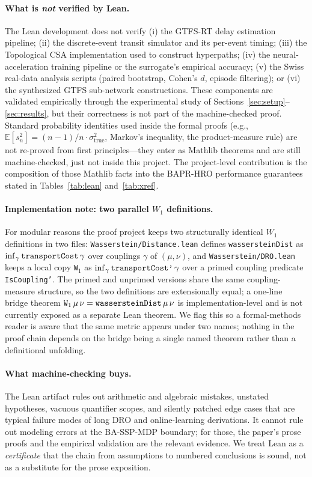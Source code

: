 \documentclass[opre,dblanonrev]{informs4}
\renewcommand{\mathtt}[1]{\mbox{\ttfamily #1}}
\begin{document}
\paragraph{What is \emph{not} verified by Lean.}
The Lean development does not verify (i) the GTFS-RT delay
estimation pipeline; (ii) the discrete-event transit simulator and
its per-event timing; (iii) the Topological CSA implementation used
to construct hyperpaths; (iv) the neural-acceleration training
pipeline or the surrogate's empirical accuracy; (v) the Swiss
real-data analysis scripts (paired bootstrap, Cohen's $d$, episode
filtering); or (vi) the synthesized GTFS sub-network constructions.
These components are validated empirically through the experimental
study of Sections~\ref{sec:setup}--\ref{sec:results}, but their
correctness is not part of the machine-checked proof. Standard
probability identities used inside the formal proofs (e.g.,
$\mathbb{E}[s_n^2] = (n-1)/n \cdot \sigma_{\mathrm{true}}^2$,
Markov's inequality, the product-measure rule) are not re-proved
from first principles---they enter as Mathlib theorems and are still
machine-checked, just not inside this project. The project-level
contribution is the composition of those Mathlib facts into the
BAPR-HRO performance guarantees stated in Tables~\ref{tab:lean}
and~\ref{tab:xref}.

\paragraph{Implementation note: two parallel $W_1$ definitions.}
For modular reasons the proof project keeps two structurally
identical $W_1$ definitions in two files: \texttt{Wasserstein/Distance.lean}
defines \texttt{wassersteinDist} as $\inf_\gamma \mathtt{transportCost}\,\gamma$
over couplings $\gamma$ of $(\mu,\nu)$, and
\texttt{Wasserstein/DRO.lean} keeps a local copy \texttt{W$_1$} as
$\inf_\gamma \mathtt{transportCost'}\,\gamma$ over a primed coupling
predicate \texttt{IsCoupling'}. The primed and unprimed versions
share the same coupling-measure structure, so the two definitions
are extensionally equal; a one-line bridge theorem
$\mathtt{W}_1\,\mu\,\nu = \mathtt{wassersteinDist}\,\mu\,\nu$ is
implementation-level and is not currently exposed as a separate
Lean theorem. We flag this so a formal-methods reader is aware
that the same metric appears under two names; nothing in the proof
chain depends on the bridge being a single named theorem rather
than a definitional unfolding.

\paragraph{What machine-checking buys.}
The Lean artifact rules out arithmetic and algebraic mistakes,
unstated hypotheses, vacuous quantifier scopes, and silently
patched edge cases that are typical failure modes of long DRO and
online-learning derivations. It cannot rule out modeling errors at
the BA-SSP-MDP boundary; for those, the paper's prose proofs and the
empirical validation are the relevant evidence. We treat Lean as a
\emph{certificate} that the chain from assumptions to numbered
conclusions is sound, not as a substitute for the prose exposition.
\end{document}
